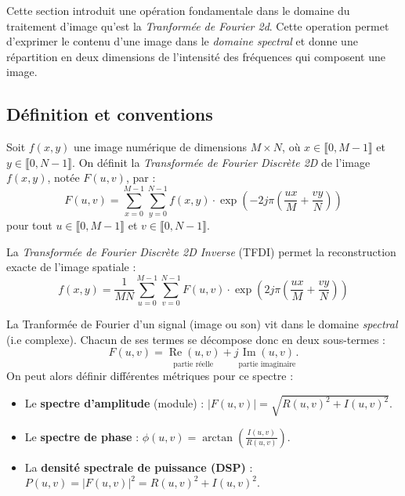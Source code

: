 Cette section introduit une opération fondamentale dans le domaine du traitement d'image qu'est la \emph{Tranformée de Fourier 2d}. Cette operation permet d'exprimer le contenu d'une image dans le \emph{domaine spectral} et donne une répartition en deux dimensions de l'intensité des fréquences qui composent une image. 

\subsection{Définition et conventions}

\begin{definition}
    Soit $f(x,y)$ une image numérique de dimensions $M \times N$, où $x \in \llbracket 0, M-1 \rrbracket$ et $y \in \llbracket 0, N-1 \rrbracket$.
    On définit la \emph{Transformée de Fourier Discrète 2D} de l'image $f(x,y)$, notée $F(u,v)$, par :
        \begin{equation}
            \boxed{F(u,v) = \sum_{x=0}^{M-1} \sum_{y=0}^{N-1} f(x,y) \cdot \exp  \left( -2j \pi \left( \frac{ux}{M} + \frac{vy}{N} \right)\right) } 
        \end{equation}
    pour tout $u \in \llbracket 0, M-1 \rrbracket$ et $v \in \llbracket 0, N-1 \rrbracket$. 
    
    La \emph{Transformée de Fourier Discrète 2D Inverse} (TFDI) permet la reconstruction exacte de l'image spatiale :
        \begin{equation}
            \boxed{f(x,y) = \frac{1}{MN} \sum_{u=0}^{M-1} \sum_{v=0}^{N-1} F(u,v) \cdot \exp \left( 2j \pi \left( \frac{ux}{M} + \frac{vy}{N} \right)\right) }
        \end{equation}
\end{definition}

\begin{proposition}
    La Tranformée de Fourier d'un signal (image ou son) vit dans le domaine \emph{spectral} (i.e complexe). Chacun de ses termes se décompose donc en deux sous-termes : 
    $$ F(u,v) = 
        \underset{\text{partie réelle}}{\operatorname{Re}(u,v)} + j 
        \underset{\text{partie imaginaire}}{ \operatorname{Im}(u,v)}. 
    $$
    On peut alors définir différentes métriques pour ce spectre : 
    \begin{itemize}
        \item Le \textbf{spectre d'amplitude} (module) : $|F(u,v)| = \sqrt{R(u,v)^2 + I(u,v)^2}$.
        \item Le \textbf{spectre de phase} : $\phi(u,v) = \operatorname{arctan}\left(\frac{I(u,v)}{R(u,v)}\right)$.
        \item La \textbf{densité spectrale de puissance (DSP)} : $P(u,v) = |F(u,v)|^2 = R(u,v)^2 + I(u,v)^2$.
    \end{itemize}
\end{proposition}

